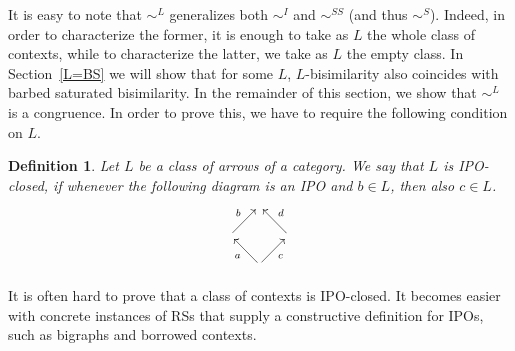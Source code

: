 \documentclass[copyright,creativecommons]{eptcs}
\newcommand{\bisl}{\sim^{L}}
\newcommand{\<}{\langle}
\renewcommand{\>}{\rangle}
\newtheorem{definition}{Definition}{}
\begin{document}
It is easy to note that $\bisl$ generalizes both $\sim^I$ and
$\sim^{SS}$ (and thus $\sim^S$). Indeed, in order to characterize
the former, it is enough to take as $L$ the whole class of contexts,
while to characterize the latter, we take as $L$ the empty class. In
Section~\ref{L=BS} we will show that for some $L$,
$L$-bisimilarity also coincides with barbed saturated bisimilarity.
In the remainder of this section, we show that $\bisl$ is a
congruence. In order to prove this, we have to require the following
condition on $L$.

\begin{definition} Let $L$ be a class of arrows of a category. We say that $L$ is
IPO-closed, if whenever the following diagram is an IPO and $b\in
L$, then also $c\in L$.
$$
\xymatrix@C=15pt@R=15pt
      {
        &\\
\ar[ur]^b & & \ar[ul]_d\\
& \ar[ul]^a \ar[ur]_c
      }$$
\end{definition}

It is often hard to prove that a class of contexts is IPO-closed.
It becomes easier with concrete instances of RSs
that supply a constructive definition for IPOs, such as
bigraphs and borrowed contexts.
\end{document}
